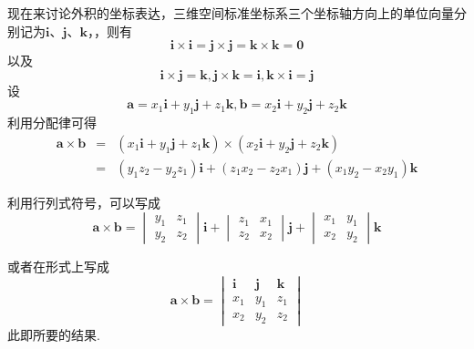 现在来讨论外积的坐标表达，三维空间标准坐标系三个坐标轴方向上的单位向量分别记为$\bm i$、$\bm j$、$\bm k$，，则有
\[ \bm i \times \bm i = \bm j \times \bm j = \bm k \times \bm k = \bm 0  \]
以及
\[ \bm i \times \bm j = \bm k, \bm j \times \bm k = \bm i, \bm k \times \bm i = \bm j \]
设
\[ \bm a = x_1 \bm i + y_1 \bm j + z_1 \bm k, \bm b = x_2 \bm i + y_2 \bm j + z_2 \bm k \]
利用分配律可得
\begin{eqnarray*}
  \bm a \times \bm b & = & (x_1 \bm i + y_1 \bm j + z_1 \bm k) \times (x_2 \bm i + y_2 \bm j + z_2 \bm k) \\
  & = & (y_1z_2-y_2z_1) \bm i + (z_1x_2-z_2x_1) \bm j + (x_1y_2-x_2y_1) \bm k
\end{eqnarray*}

利用行列式符号，可以写成
\[ \bm a \times \bm b =
  \begin{vmatrix}
    y_1 & z_1 \\
    y_2 & z_2
  \end{vmatrix}
  \bm i +
  \begin{vmatrix}
    z_1 & x_1 \\
    z_2 & x_2
  \end{vmatrix}
  \bm j +
  \begin{vmatrix}
    x_1 & y_1 \\
    x_2 & y_2
  \end{vmatrix}
  \bm k
\]

或者在形式上写成
\[ \bm a \times \bm b =
  \begin{vmatrix}
    \bm i & \bm j & \bm k \\
    x_1 & y_1 & z_1 \\
    x_2 & y_2 & z_2
  \end{vmatrix}
\]
此即所要的结果.


